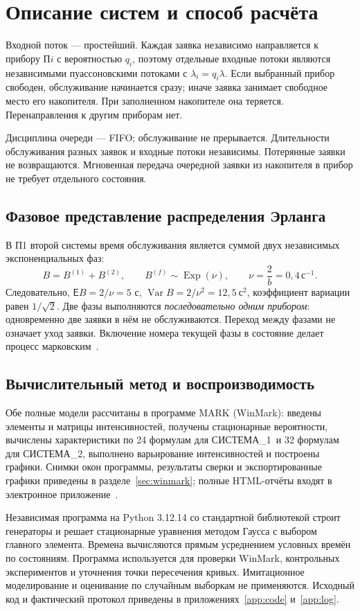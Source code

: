 \documentclass[a4paper,12pt]{article}
\newcommand{\sysone}{СИСТЕМА\_1}
\newcommand{\systwo}{СИСТЕМА\_2}
\newcommand{\secunit}{\,\text{с}^{-1}}
\begin{document}
\section{Описание систем и способ расчёта}
Входной поток --- простейший. Каждая заявка независимо направляется к прибору П$i$ с вероятностью $q_i$, поэтому отдельные входные потоки являются независимыми пуассоновскими потоками с $\lambda_i=q_i\lambda$. Если выбранный прибор свободен, обслуживание начинается сразу; иначе заявка занимает свободное место его накопителя. При заполненном накопителе она теряется. Перенаправления к другим приборам нет.

Дисциплина очереди --- FIFO; обслуживание не прерывается. Длительности обслуживания разных заявок и входные потоки независимы. Потерянные заявки не возвращаются. Мгновенная передача очередной заявки из накопителя в прибор не требует отдельного состояния.

\subsection{Фазовое представление распределения Эрланга}
В П1 второй системы время обслуживания является суммой двух независимых экспоненциальных фаз:
\[
B=B^{(1)}+B^{(2)},\qquad B^{(f)}\sim\operatorname{Exp}(\nu),\qquad
\nu=\frac{2}{b}=0{,}4\secunit.
\]
Следовательно, $\mathsf E B=2/\nu=5$ с, $\operatorname{Var}B=2/\nu^2=12{,}5\ \text{с}^2$, коэффициент вариации равен $1/\sqrt2$. Две фазы выполняются \emph{последовательно одним прибором}: одновременно две заявки в нём не обслуживаются. Переход между фазами не означает уход заявки. Включение номера текущей фазы в состояние делает процесс марковским~\cite{theory}.

\subsection{Вычислительный метод и воспроизводимость}
Обе полные модели рассчитаны в программе MARK (WinMark): введены элементы и матрицы интенсивностей, получены стационарные вероятности, вычислены характеристики по 24 формулам для \sysone\ и 32 формулам для \systwo, выполнено варьирование интенсивностей и построены графики. Снимки окон программы, результаты сверки и экспортированные графики приведены в разделе~\ref{sec:winmark}; полные HTML-отчёты входят в электронное приложение~\cite{mark1,mark2}.

Независимая программа на Python 3.12.14 со стандартной библиотекой строит генераторы и решает стационарные уравнения методом Гаусса с выбором главного элемента. Времена вычисляются прямым усреднением условных времён по состояниям. Программа используется для проверки WinMark, контрольных экспериментов и уточнения точки пересечения кривых. Имитационное моделирование и оценивание по случайным выборкам не применяются. Исходный код и фактический протокол приведены в приложениях~\ref{app:code} и~\ref{app:log}.
\end{document}
